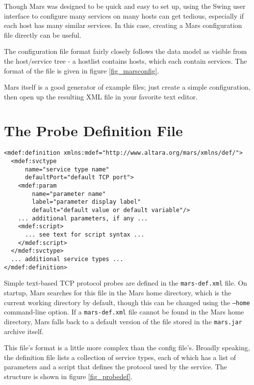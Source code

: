 \documentclass{article}
\newcommand{\filename}[1]{{\tt #1}}
\newcommand{\cmdline}[1]{{\tt #1}}
\begin{document}
Though Mars was designed to be quick and easy to set up, using the Swing user
interface to configure many services on many hosts can get tedious, especially
if each host has many similar services.  In this case, creating a Mars
configuration file directly can be useful. 

The configuration file format fairly closely follows the data model as visible
from the host/service tree - a hostlist contains hosts, which each contain
services. The format of the file is given in figure \ref{fig_marsconfig}.

Mars itself is a good generator of example files; just create a simple
configuration, then open up the resulting XML file in your favorite text
editor.

\section{The Probe Definition File}
\label{sec_marsdef}
\begin{center}
\begin{figure*}
\begin{verbatim}
<mdef:definition xmlns:mdef="http://www.altara.org/mars/xmlns/def/">
  <mdef:svctype
      name="service type name"
      defaultPort="default TCP port">
    <mdef:param
        name="parameter name"
        label="parameter display label"
        default="default value or default variable"/>
    ... additional parameters, if any ...
    <mdef:script>
      ... see text for script syntax ...
    </mdef:script>
  </mdef:svctype>
  ... additional service types ...
</mdef:definition>
\end{verbatim}
\caption{Mars probe definition file structure}
\label{fig_probedef}
\end{figure*}
\end{center}	

Simple text-based TCP protocol probes are defined in the
\filename{mars-def.xml} file.  On startup, Mars searches for this file
in the Mars home directory, which is the current working directory by
default, though this can be changed using the \cmdline{--home}
command-line option. If a \filename{mars-def.xml} file cannot be found
in the Mars home directory, Mars falls back to a default version of
the file stored in the \filename{mars.jar} archive itself.

This file's format is a little more complex than the config file's.  Broadly
speaking, the definition file lists a collection of service types, each of
which has a list of parameters and a script that defines the protocol used by
the service. The structure is shown in figure \ref{fig_probedef}.
\end{document}
